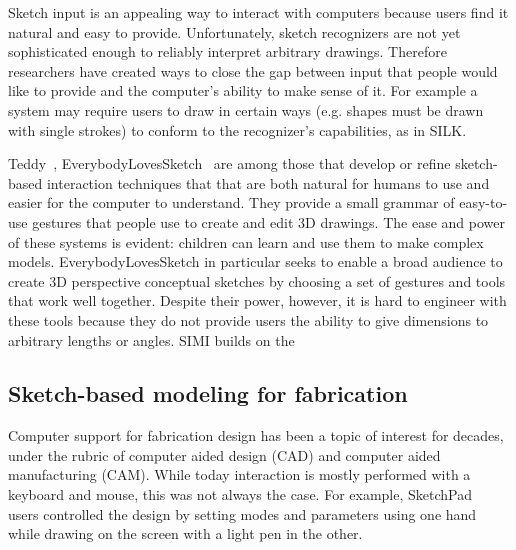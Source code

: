\documentclass{article}
\begin{document}

Sketch input is an appealing way to interact with computers because
users find it natural and easy to provide. Unfortunately, sketch
recognizers are not yet sophisticated enough to reliably interpret
arbitrary drawings. Therefore researchers have created ways to close
the gap between input that people would like to provide and the
computer's ability to make sense of it. For example a system may
require users to draw in certain ways (e.g. shapes must be drawn with
single strokes) to conform to the recognizer's capabilities, as in
SILK. 

Teddy~\cite{igarashi-teddy}, EverybodyLovesSketch~\cite{bae-everybody}
are among those that develop or refine sketch-based interaction
techniques that that are both natural for humans to use and easier for
the computer to understand.  They provide a small grammar of
easy-to-use gestures that people use to create and edit 3D
drawings. The ease and power of these systems is evident: children can
learn and use them to make complex models. EverybodyLovesSketch in
particular seeks to enable a broad audience to create 3D perspective
conceptual sketches by choosing a set of gestures and tools that work
well together. Despite their power, however, it is hard to engineer
with these tools because they do not provide users the ability to give
dimensions to arbitrary lengths or angles. SIMI builds on the 


\subsection{Sketch-based modeling for fabrication}

Computer support for fabrication design has been a topic of interest
for decades, under the rubric of computer aided design (CAD) and
computer aided manufacturing (CAM). While today interaction is mostly
performed with a keyboard and mouse, this was not always the case. For
example, SketchPad~\cite{sutherland-sketchpad} users controlled the
design by setting modes and parameters using one hand while drawing on
the screen with a light pen in the other.
\end{document}
